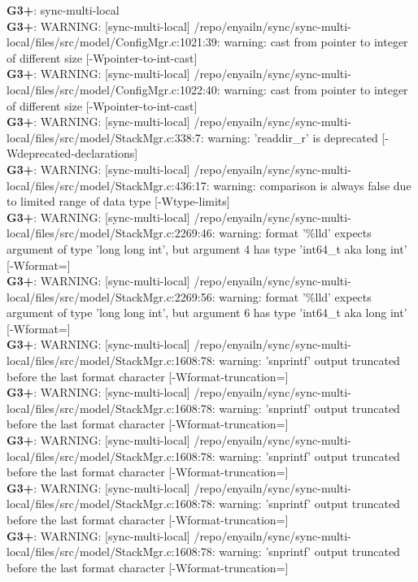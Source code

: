 \documentclass[12pt,twoside]{article}
\begin{document}
\textbf{G3+}: sync-multi-local\\ 
\textbf{G3+}: WARNING: [sync-multi-local] /repo/enyailn/sync/sync-multi-local/files/src/model/ConfigMgr.c:1021:39: warning: cast from pointer to integer of different size [-Wpointer-to-int-cast]\\ 
\textbf{G3+}: WARNING: [sync-multi-local] /repo/enyailn/sync/sync-multi-local/files/src/model/ConfigMgr.c:1022:40: warning: cast from pointer to integer of different size [-Wpointer-to-int-cast]\\ 
\textbf{G3+}: WARNING: [sync-multi-local] /repo/enyailn/sync/sync-multi-local/files/src/model/StackMgr.c:338:7: warning: 'readdir\_r' is deprecated [-Wdeprecated-declarations]\\ 
\textbf{G3+}: WARNING: [sync-multi-local] /repo/enyailn/sync/sync-multi-local/files/src/model/StackMgr.c:436:17: warning: comparison is always false due to limited range of data type [-Wtype-limits]\\ 
\textbf{G3+}: WARNING: [sync-multi-local] /repo/enyailn/sync/sync-multi-local/files/src/model/StackMgr.c:2269:46: warning: format '\%lld' expects argument of type 'long long int', but argument 4 has type 'int64\_t {aka long int}' [-Wformat=]\\ 
\textbf{G3+}: WARNING: [sync-multi-local] /repo/enyailn/sync/sync-multi-local/files/src/model/StackMgr.c:2269:56: warning: format '\%lld' expects argument of type 'long long int', but argument 6 has type 'int64\_t {aka long int}' [-Wformat=]\\ 
\textbf{G3+}: WARNING: [sync-multi-local] /repo/enyailn/sync/sync-multi-local/files/src/model/StackMgr.c:1608:78: warning: 'snprintf' output truncated before the last format character [-Wformat-truncation=]\\ 
\textbf{G3+}: WARNING: [sync-multi-local] /repo/enyailn/sync/sync-multi-local/files/src/model/StackMgr.c:1608:78: warning: 'snprintf' output truncated before the last format character [-Wformat-truncation=]\\ 
\textbf{G3+}: WARNING: [sync-multi-local] /repo/enyailn/sync/sync-multi-local/files/src/model/StackMgr.c:1608:78: warning: 'snprintf' output truncated before the last format character [-Wformat-truncation=]\\ 
\textbf{G3+}: WARNING: [sync-multi-local] /repo/enyailn/sync/sync-multi-local/files/src/model/StackMgr.c:1608:78: warning: 'snprintf' output truncated before the last format character [-Wformat-truncation=]\\ 
\textbf{G3+}: WARNING: [sync-multi-local] /repo/enyailn/sync/sync-multi-local/files/src/model/StackMgr.c:1608:78: warning: 'snprintf' output truncated before the last format character [-Wformat-truncation=]\\ 
\end{document}
